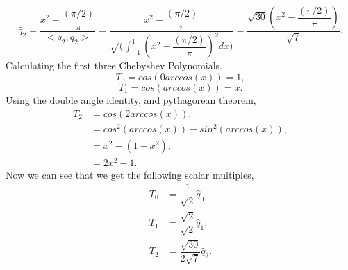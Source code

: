 \documentclass[12pt]{article}
\makeatletter
\theoremstyle{homework}
\newenvironment{exercise}[1]
{\def\@currentlabel{#1}\exercisecore}
{\endexercisecore}
\makeatother
\begin{document}
\begin{exercise}{Problem 10.5}
    \begin{equation*}
            \hat{q}_2 = \dfrac{x^2 - \dfrac{(\pi/2)}{\pi}}{<q_2,q_2>}= \dfrac{x^2 - \dfrac{(\pi/2)}{\pi}}{\sqrt(\int_{-1}^{1} (x^2 - \dfrac{(\pi/2)}{\pi})^2 dx)} = \dfrac{\sqrt{30}(x^2 - \dfrac{(\pi/2)}{\pi})}{\sqrt{7}}.
    \end{equation*}
    Calculating the first three Chebyshev Polynomials.
    \begin{equation*}
        T_0 = cos(0 arccos(x)) = 1,
    \end{equation*}
    \begin{equation*}
        T_1 = cos(arccos(x)) = x.
    \end{equation*}
    Using the double angle identity, and pythagorean theorem,
    \begin{align*}
        T_2 &= cos(2 arccos(x)),\\
        &= cos^2(arccos(x))  - sin^2(arccos(x)),\\
        &= x^2 - (1 - x^2),\\
        &= 2x^2 - 1.
    \end{align*}
    Now we can see that we get the following scalar multiples,
    \begin{align*}
        T_0 &= \dfrac{1}{\sqrt{2}}\hat{q}_0,\\
        T_1 &= \dfrac{\sqrt{2}}{\sqrt{2}}\hat{q}_1,\\
        T_2 &= \dfrac{\sqrt{30}}{2\sqrt{7}}\hat{q}_2.
    \end{align*} 
\end{exercise}
\vspace{.5in}
\end{document}
